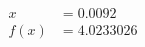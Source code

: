 \documentclass[preview]{standalone}
\begin{document}
\begin{align*}
x &= 0.0092\\f(x) &= 4.0233026
\end{align*}
\end{document}
